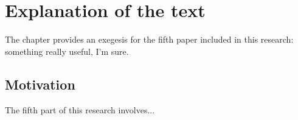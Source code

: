 

\section{Explanation of the text}

The chapter provides an exegesis for the fifth paper included in this research: something really useful, I'm sure. 

\subsection{Motivation}
The fifth part of this research involves...

